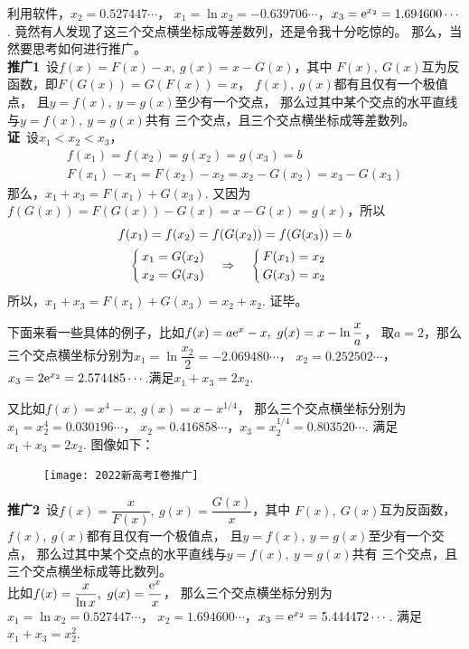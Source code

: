 \begin{enumerate}[label={【\textbf{例\thechapter.\arabic*}】},
 leftmargin=\inteval{\myenumleftmargin}pt,
 itemsep=\inteval{\myenumitempsep}pt,
 itemindent=\inteval{\myenumitemindent}pt]
利用软件，$ x_2=0.527447\cdots $，
$ x_1=\ln x_2=-0.639706\cdots $，$ x_3=\mathrm{e}^{x_2}=1.694600\cdots $. 
竟然有人发现了这三个交点横坐标成等差数列，还是令我十分吃惊的。
那么，当然要思考如何进行推广。\\ 
\textbf{推广1}\ 设$ f(x)=F(x)-x,\ g(x)=x-G(x) $，其中
$ F(x),\ G(x) $互为反函数，即$ F(G(x))=G(F(x))=x $，
$ f(x),\ g(x) $都有且仅有一个极值点，
且$ y=f(x),\ y=g(x) $至少有一个交点，
那么过其中某个交点的水平直线与$ y=f(x),\ y=g(x) $共有
三个交点，且三个交点横坐标成等差数列。\\
\textbf{证}\ 设$ x_1<x_2<x_3 $，
\begin{gather*}
    f(x_1)=f(x_2)=g(x_2)=g(x_3)=b \\
    F(x_1)-x_1=F(x_2)-x_2=x_2-G(x_2)=x_3-G(x_3) 
\end{gather*}
那么，$ x_1+x_3=F(x_1)+G(x_3) $. 又因为
$ f(G(x))=F(G(x))-G(x)=x-G(x)=g(x) $，所以
\begin{gather*}
    f(x_1)=f(x_2)=f(G(x_2))=f(G(x_3))=b \\
    \begin{cases}
        x_1=G(x_2) \\
        x_2=G(x_3)
    \end{cases} \Rightarrow \quad 
    \begin{cases}
        F(x_1)=x_2 \\
        G(x_3)=x_2
    \end{cases} 
\end{gather*}
所以，$ x_1+x_3=F(x_1)+G(x_3)=x_2+x_2 $. 证毕。

下面来看一些具体的例子，比如$ f(x)=a\e^x-x,\ g(x)=x-\ln\dfrac{x}{a} $，
取$ a=2 $，那么三个交点横坐标分别为$ x_1=\ln\dfrac{x_2}{2}=-2.069480\cdots $，
$ x_2=0.252502\cdots $，$ x_3=2\mathrm{e}^{x_2}=2.574485\cdots $.满足$ x_1+x_3=2x_2 $.

又比如$ f(x)=x^4-x,\ g(x)=x-x^{1/4} $，
那么三个交点横坐标分别为$ x_1=x_2^4=0.030196\cdots $，
$ x_2=0.416858\cdots $，$ x_3=x_2^{1/4}=0.803520\cdots $.
满足$ x_1+x_3=2x_2 $. 图像如下：
\begin{figure}[!ht]
    \centering
    \texttt{[image: 2022新高考I卷推广]}
\end{figure}

\textbf{推广2}\ 设$ f(x)=\dfrac{x}{F(x)},\ g(x)=\dfrac{G(x)}{x} $，其中
$ F(x),\ G(x) $互为反函数，$ f(x),\ g(x) $都有且仅有一个极值点，
且$ y=f(x),\ y=g(x) $至少有一个交点，
那么过其中某个交点的水平直线与$ y=f(x),\ y=g(x) $共有
三个交点，且三个交点横坐标成等比数列。\\
比如$ f(x)=\dfrac{x}{\ln x},\ g(x)=\dfrac{\e^x}{x} $，
那么三个交点横坐标分别为$ x_1=\ln x_2=0.527447\cdots $，
$ x_2=1.694600\cdots $，$ x_3=\mathrm{e}^{x_2}=5.444472\cdots $.
满足$ x_1+x_3=x_2^2 $.


\end{enumerate}
